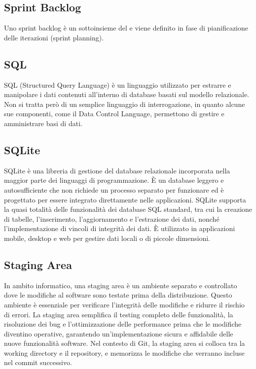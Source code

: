 \vspace{2em}
\subsection*{Sprint Backlog}
\par Uno sprint backlog è un sottoinsieme del  e viene definito in fase di pianificazione delle iterazioni (sprint planning).

\vspace{2em}
\subsection*{SQL}
\par SQL (Structured Query Language) è un linguaggio utilizzato per estrarre e manipolare i dati contenuti all'interno di database basati sul modello relazionale. Non si tratta però di un semplice linguaggio di interrogazione, in quanto alcune sue componenti, come il Data Control Language, permettono di gestire e amministrare basi di dati.

\vspace{2em}
\subsection*{SQLite}
\par SQLite è una libreria di gestione del database relazionale incorporata nella maggior parte dei linguaggi di programmazione. È un database leggero e autosufficiente che non richiede un processo separato per funzionare ed è progettato per essere integrato direttamente nelle applicazioni. SQLite supporta la quasi totalità delle funzionalità dei database SQL standard, tra cui la creazione di tabelle, l'inserimento, l'aggiornamento e l'estrazione dei dati, nonché l'implementazione di vincoli di integrità dei dati. È utilizzato in applicazioni mobile, desktop e web per gestire dati locali o di piccole dimensioni.

\vspace{2em}
\subsection*{Staging Area}
\par In ambito informatico, una staging area è un ambiente separato e controllato dove le modifiche al software sono testate prima della distribuzione. Questo ambiente è essenziale per verificare l'integrità delle modifiche e ridurre il rischio di errori. La staging area semplifica il testing completo delle funzionalità, la risoluzione dei bug e l'ottimizzazione delle performance prima che le modifiche diventino operative, garantendo un'implementazione sicura e affidabile delle nuove funzionalità software. Nel contesto di Git, la staging area si colloca tra la working directory e il repository, e memorizza le modifiche che verranno incluse nel commit successivo.

